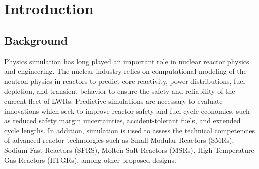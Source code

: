 \chapter{Introduction}
\label{chap:intro}

\section{Background}
\label{sec:chap1-background}



Physics simulation has long played an important role in nuclear reactor physics and engineering. The nuclear industry relies on computational modeling of the neutron physics in reactors to predict core reactivity, power distributions, fuel depletion, and transient behavior to ensure the safety and reliability of the current fleet of \ac{LWR}s. Predictive simulations are necessary to evaluate innovations which seek to improve reactor safety and fuel cycle economics, such as reduced safety margin uncertainties, accident-tolerant fuels, and extended cycle lengths. In addition, simulation is used to assess the technical competencies of advanced reactor technologies such as Small Modular Reactors (SMRs), Sodium Fast Reactors (SFRS), Molten Salt Reactors (MSRs), High Temperature Gas Reactors (HTGRs), among other proposed designs. 

